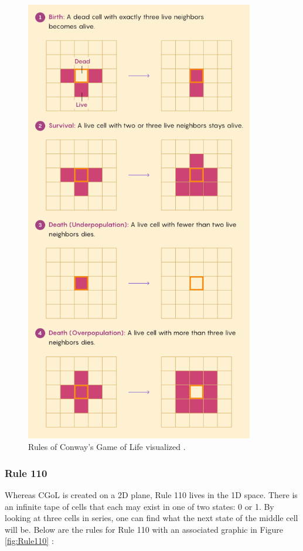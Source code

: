 \begin{figure}[h!]
    \centering
    \includegraphics[width=10cm]{Images/CGoL.png}
       \caption{Rules of Conway's Game of Life visualized \cite{CGoLImg}.}
            \label{fig:cgolrules}
\end{figure}

\newpage

\subsubsection{Rule 110}\label{subsubsec:Rule110}

Whereas CGoL is created on a 2D plane, Rule 110 lives in the 1D space.
There is an infinite tape of cells that each may exist in one of two states: 0 or 1.
By looking at three cells in series, one can find what the next state of the middle cell will be.
Below are the rules for Rule 110 with an associated graphic in Figure \ref{fig:Rule110} \cite{Rule110Img}:

